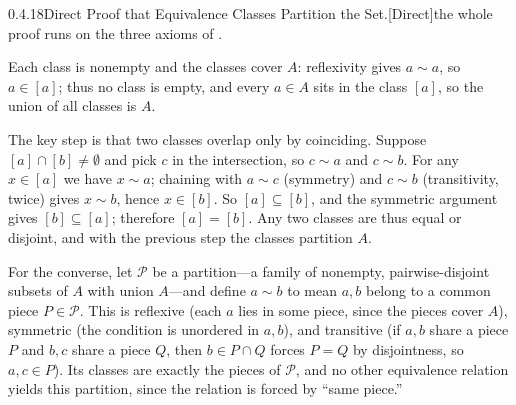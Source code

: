 \documentclass[main.tex]{subfiles}
\begin{document}
\begin{Prf}{0.4.18}{Direct Proof that Equivalence Classes Partition the Set.}{[Direct]\quad the whole proof runs on the three axioms of .}
\item Each class is nonempty and the classes cover $A$: reflexivity gives $a\sim a$, so $a\in[a]$;
thus no class is empty, and every $a\in A$ sits in the class $[a]$, so the union of all classes is $A$.
\item The key step is that two classes overlap only by coinciding. Suppose $[a]\cap[b]\neq\emptyset$
and pick $c$ in the intersection, so $c\sim a$ and $c\sim b$. For any $x\in[a]$ we have $x\sim a$;
chaining with $a\sim c$ (symmetry) and $c\sim b$ (transitivity, twice) gives $x\sim b$, hence
$x\in[b]$. So $[a]\subseteq[b]$, and the symmetric argument gives $[b]\subseteq[a]$; therefore
$[a]=[b]$. Any two classes are thus equal or disjoint, and with the previous step the classes
partition $A$.
\item For the converse, let $\mathcal P$ be a partition---a family of nonempty, pairwise-disjoint
subsets of $A$ with union $A$---and define $a\sim b$ to mean $a,b$ belong to a common piece $P\in
\mathcal P$. This is reflexive (each $a$ lies in some piece, since the pieces cover $A$), symmetric
(the condition is unordered in $a,b$), and transitive (if $a,b$ share a piece $P$ and $b,c$ share a
piece $Q$, then $b\in P\cap Q$ forces $P=Q$ by disjointness, so $a,c\in P$). Its classes are exactly
the pieces of $\mathcal P$, and no other equivalence relation yields this partition, since the relation
is forced by ``same piece.''
\end{Prf}
\end{document}
